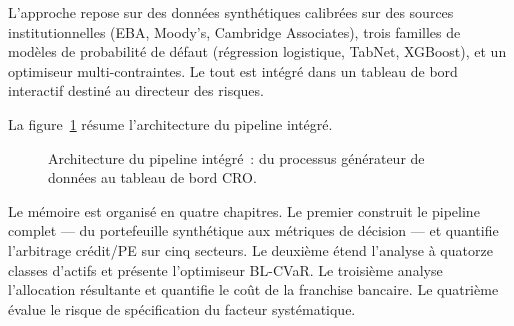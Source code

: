 \documentclass[10pt, a4paper, oneside]{report}
\theoremstyle{definition}
\begin{document}
L'approche repose sur des données synthétiques calibrées sur des sources institutionnelles (EBA, Moody's, Cambridge Associates), trois familles de modèles de probabilité de défaut (régression logistique, TabNet, XGBoost), et un optimiseur multi-contraintes.
Le tout est intégré dans un tableau de bord interactif destiné au directeur des risques.

La figure~\ref{fig:pipeline} résume l'architecture du pipeline intégré.

\begin{figure}[htbp]
\centering
{}
\caption{Architecture du pipeline intégré~: du processus générateur de données au tableau de bord CRO.}
\label{fig:pipeline}
\end{figure}

Le mémoire est organisé en quatre chapitres. Le premier construit le pipeline complet --- du portefeuille synthétique aux métriques de décision --- et quantifie l'arbitrage crédit/PE sur cinq secteurs. Le deuxième étend l'analyse à quatorze classes d'actifs et présente l'optimiseur BL-CVaR. Le troisième analyse l'allocation résultante et quantifie le coût de la franchise bancaire. Le quatrième évalue le risque de spécification du facteur systématique.


\end{document}
